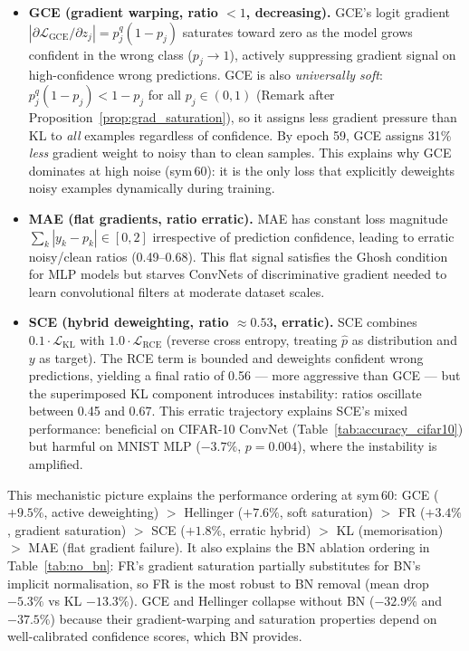 \documentclass[11pt]{article}
\begin{document}
\begin{itemize}
  \item \textbf{GCE (gradient warping, ratio $< 1$, decreasing).}
    GCE's logit gradient $|\partial \mathcal{L}_\mathrm{GCE}/\partial z_j| =
    p_j^q(1-p_j)$ saturates toward zero as the model grows confident in the wrong class
    ($p_j \to 1$), actively suppressing gradient signal on high-confidence wrong predictions.
    GCE is also \emph{universally soft}: $p_j^q(1-p_j) < 1-p_j$ for all
    $p_j\in(0,1)$ (Remark after Proposition~\ref{prop:grad_saturation}),
    so it assigns less gradient pressure than KL to \emph{all} examples regardless of confidence.
    By epoch 59, GCE assigns 31\% \emph{less} gradient weight to noisy than to
    clean samples.
    This explains why GCE dominates at high noise (sym\,60): it is the only
    loss that explicitly deweights noisy examples dynamically during training.

  \item \textbf{MAE (flat gradients, ratio erratic).}
    MAE has constant loss magnitude $\sum_k |y_k - p_k| \in [0,2]$ irrespective
    of prediction confidence, leading to erratic noisy/clean ratios (0.49--0.68).
    This flat signal satisfies the Ghosh condition for MLP models but starves
    ConvNets of discriminative gradient needed to learn convolutional filters at
    moderate dataset scales.

  \item \textbf{SCE (hybrid deweighting, ratio $\approx 0.53$, erratic).}
    SCE combines $0.1 \cdot \mathcal{L}_\mathrm{KL}$ with
    $1.0 \cdot \mathcal{L}_\mathrm{RCE}$ (reverse cross entropy, treating
    $\hat{p}$ as distribution and $y$ as target).
    The RCE term is bounded and deweights confident wrong predictions, yielding a
    final ratio of 0.56 --- more aggressive than GCE --- but the superimposed KL
    component introduces instability: ratios oscillate between 0.45 and 0.67.
    This erratic trajectory explains SCE's mixed performance: beneficial on
    CIFAR-10 ConvNet (Table~\ref{tab:accuracy_cifar10}) but harmful on MNIST MLP
    ($-3.7\%$, $p=0.004$), where the instability is amplified.
\end{itemize}

This mechanistic picture explains the performance ordering at sym\,60:
GCE ($+9.5\%$, active deweighting) $>$ Hellinger ($+7.6\%$, soft saturation) $>$
FR ($+3.4\%$, gradient saturation) $>$ SCE ($+1.8\%$, erratic hybrid) $>$ KL (memorisation) $>$ MAE (flat gradient failure).
It also explains the BN ablation ordering in Table~\ref{tab:no_bn}: FR's
gradient saturation partially substitutes for BN's implicit normalisation,
so FR is the most robust to BN removal (mean drop $-5.3\%$ vs KL $-13.3\%$).
GCE and Hellinger collapse without BN ($-32.9\%$ and $-37.5\%$) because their
gradient-warping and saturation properties depend on well-calibrated confidence
scores, which BN provides.
\end{document}
